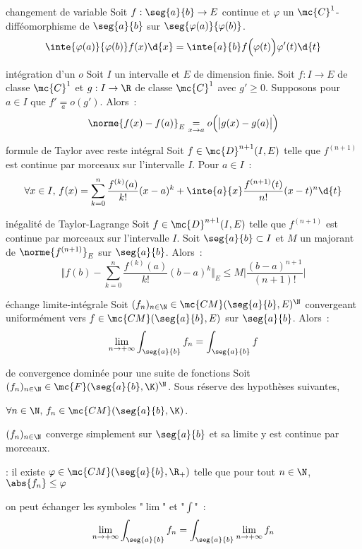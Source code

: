 \begin{adjustwidth}{-3cm}{-3cm}
\begin{theoreme}{10.39}{changement de variable}
    Soit $f:\seg{a}{b}\to E$ continue et $\varphi$ un $\mc{C}^1$-difféomorphisme de $\seg{a}{b}$ sur $\seg{\varphi(a)}{\varphi(b)}$.
    $$\inte{\varphi(a)}{\varphi(b)}f(x)\d{x} = \inte{a}{b}f\Bigl(\varphi(t)\Bigr)\varphi'(t)\d{t}$$
\end{theoreme}

\begin{theoreme}{10.42}{intégration d'un $o$}
    Soit $I$ un intervalle et $E$ de dimension finie. Soit $f:I \to E$ de classe $\mc{C}^1$ et $g:I\to \R$ de classe $\mc{C}^1$ avec $g' \geq 0$. Supposons pour $a \in I$ que $f' \underset{a}{=}o(g')$. Alors~:
    $$\norme{f(x) - f(a)}_E \underset{x \to a}{=} o\Big(\big\vert g(x) - g(a) \big\vert\Big)$$
\end{theoreme}

\begin{theoreme}{10.47}{formule de Taylor avec reste intégral}
    Soit $f\in \mc{D}^{n+1}(I,E)$ telle que $f^{(n+1)}$ est continue par morceaux sur l'intervalle $I$. Pour $a \in I$~:
    $$\forall x \in I,\, f(x) = \sum_{k=0}^n \frac{f^{(k)}(a)}{k!}(x-a)^k + \inte{a}{x}\frac{f^{(n+1)}(t)}{n!}(x-t)^n \d{t}$$
\end{theoreme}


\begin{theoreme}{10.48}{inégalité de Taylor-Lagrange}
    Soit $f\in \mc{D}^{n+1}(I,E)$ telle que $f^{(n+1)}$ est continue par morceaux sur l'intervalle $I$. Soit $\seg{a}{b} \subset I$ et $M$ un majorant de $\norme{f^{(n+1)}}_E$ sur $\seg{a}{b}$. Alors~:
    $$\Bigg\Vert f(b) - \sum_{k=0}^n \frac{f^{(k)}(a)}{k!}(b-a)^k\Bigg\Vert_E \leq M \bigg\vert \frac{(b-a)^{n+1}}{(n+1)!} \bigg\vert$$
\end{theoreme}

\begin{theoreme}{10.57}{échange limite-intégrale}
    Soit $(f_n)_{n \in \N} \in \mc{CM}(\seg{a}{b},E)^\N$ convergeant uniformément vers $f \in \mc{CM}(\seg{a}{b},E)$ sur $\seg{a}{b}$. Alors~:
    $$\lim_{n \to +\infty} \int_{\seg{a}{b}} f_n = \int_{\seg{a}{b}} f $$
\end{theoreme}

\begin{theoreme}{10.62}{de convergence dominée pour une suite de fonctions}
    Soit $(f_n)_{n \in \N} \in \mc{F}(\seg{a}{b},\K)^\N$. Sous réserve des hypothèses suivantes,
    \begin{enumeratebf}
        \item $\forall n \in \N,\, f_n \in \mc{CM}(\seg{a}{b},\K)$.
        \item $(f_n)_{n \in \N}$ converge simplement sur $\seg{a}{b}$ et sa limite y est continue par morceaux.
        \item {} : il existe $\varphi \in \mc{CM}(\seg{a}{b}, \R_+)$  telle que pour tout $n \in \N$,\, $\abs{f_n} \leq \varphi$
    \end{enumeratebf}
    on peut échanger les symboles "$\lim$" et "$\int$"~:
    $$\lim_{n \to +\infty} \int_{\seg{a}{b}} f_n = \int_{\seg{a}{b}} \lim_{n \to +\infty} f_n $$
\end{theoreme}


\end{adjustwidth}
